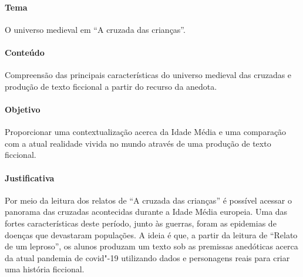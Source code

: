 \documentclass[12pt]{extarticle}
\begin{document}
 \paragraph{Tema} O universo medieval em ``A cruzada das crianças''.

 \paragraph{Conteúdo} Compreensão das principais características do universo medieval
 das cruzadas e produção de texto ficcional a partir do recurso da anedota.

 \paragraph{Objetivo} Proporcionar uma contextualização acerca da Idade Média e
 uma comparação com a atual realidade vivida no mundo através de uma produção 
 de texto ficcional.

 \paragraph{Justificativa} Por meio da leitura dos relatos de ``A cruzada das crianças''
 é possível acessar o panorama das cruzadas acontecidas durante a Idade Média europeia.
 Uma das fortes características deste período, junto às guerras, foram as epidemias de 
 doenças que devastaram populações. A ideia é que, a partir da leitura de ``Relato 
 de um leproso'', os alunos produzam um texto sob as premissas anedóticas acerca
 da atual pandemia de covid"-19 utilizando dados e personagens reais para criar uma 
 história ficcional.
\end{document}
